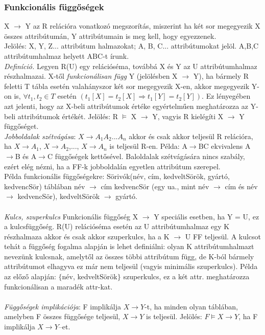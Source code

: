 \documentclass[margin=0px]{article}
\begin{document}
	\subsubsection{Funkcionális függőségek}
	
	X $\to$ Y az R relációra vonatkozó megszorítás, miszerint ha két sor megegyezik X összes attribútumán, Y attribútumain is meg kell, hogy egyezzenek. \\
	Jelölés: X, Y, Z... attribútum halmazokat; A, B, C... attribútumokat jelöl. {A,B,C} attribútumhalmaz helyett ABC-t írunk. \\
	\textit{Definíció.} Legyen R(U) egy relációséma, továbbá X és Y az U attribútumhalmaz részhalmazai. X-től \textit{funkcionálisan függ} Y (jelölésben X $\to$ Y), ha bármely R feletti T tábla esetén valahányszor két sor megegyezik X-en, akkor megegyezik Y-on is, $\forall t_1, t_2 \in T$ esetén $(t_1[X]=t_2[X] \Rightarrow t_1[Y]=t_2[Y])$. Ez lényegében azt jelenti, hogy az X-beli attribútumok értéke egyértelműen meghatározza az Y-beli attribútumok értékét. Jelölés: R $\models$ X $\to$ Y, vagyis
	R kielégíti X $\to$ Y függőséget. \\
	\textit{Jobboldalak szétvágása}: $X \to A_1A_2...A_n$ akkor és csak akkor teljesül R relációra, ha $X \to A_1$, $X \to A_2$,..., $X \to A_n$ is teljesül R-en. Példa: A$\to$BC ekvivalens A$\to$B és
	A$\to$C függőségek kettősével. Baloldalak szétvágására nincs szabály, ezért elég nézni, ha a FF-k jobboldalán egyetlen attribútum szerepel. \\
	Példa funkcionális függőségekre: Sörivók(név, cím, kedveltSörök, gyártó, kedvencSör) táblában név $\to$ cím kedvencSör (egy ua., mint név $\to$ cím és név $\to$ kedvencSör), kedveltSörök $\to$ gyártó. \\ \\
	\textit{Kulcs, szuperkulcs} Funkcionális függőség X $\to$ Y speciális esetben, ha Y = U, ez a kulcsfüggőség. R(U) relációséma esetén az U attribútumhalmaz egy K részhalmaza akkor és csak akkor szuperkulcs, ha a K $\to$ U FF teljesül. A kulcsot tehát a függőség fogalma alapján is lehet definiálni: olyan K attribútumhalmazt nevezünk kulcsnak, amelytől az összes többi attribútum függ, de K-ból bármely attribútumot elhagyva ez már nem teljesül (vagyis minimális szuperkulcs). Példa az előző alapján: $\{$név, kedveltSörök$\}$ szuperkulcs, ez a két attr. meghatározza funkcionálisan a maradék attr-kat. \\ \\
	\textit{Függőségek implikációja}: F implikálja $X \to Y$-t, ha minden olyan táblában, amelyben F összes függősége teljesül, $X \to Y$ is teljesül. Jelölés: $F \models X \to Y$, ha F implikálja $X \to Y$–et. \\
\end{document}
